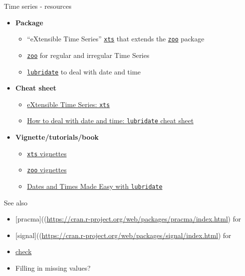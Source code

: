 \documentclass[8pt,ignorenonframetext,]{beamer}
\providecommand{\tightlist}{%
  \setlength{\itemsep}{0pt}\setlength{\parskip}{0pt}}
\begin{document}
\begin{frame}[fragile]{Time series - resources}

\begin{itemize}
\tightlist
\item
  \textbf{Package}

  \begin{itemize}
  \tightlist
  \item
    ``eXtensible Time Series''
    \href{https://cran.r-project.org/web/packages/xts/index.html}{\texttt{xts}}
    that extends the
    \href{https://cran.r-project.org/web/packages/zoo/index.html}{\texttt{zoo}}
    package
  \item
    \href{https://cran.r-project.org/web/packages/zoo/index.html}{\texttt{zoo}}
    for regular and irregular Time Series
  \item
    \href{https://cran.r-project.org/web/packages/lubridate/index.html}{\texttt{lubridate}}
    to deal with date and time
  \end{itemize}
\item
  \textbf{Cheat sheet}

  \begin{itemize}
  \tightlist
  \item
    \href{https://s3.amazonaws.com/assets.datacamp.com/blog_assets/xts_Cheat_Sheet_R.pdf}{eXtensible
    Time Series: \texttt{xts}}
  \item
    \href{https://github.com/rstudio/cheatsheets/raw/master/lubridate.pdf}{How
    to deal with date and time: \texttt{lubridate} cheat sheet}
  \end{itemize}
\item
  \textbf{Vignette/tutorials/book}

  \begin{itemize}
  \tightlist
  \item
    \href{https://cran.r-project.org/web/packages/xts/index.html}{\texttt{xts}
    vignettes}
  \item
    \href{https://cran.r-project.org/web/packages/zoo/index.html}{\texttt{zoo}
    vignettes}
  \item
    \href{http://vita.had.co.nz/papers/lubridate.pdf}{Dates and Times
    Made Easy with \texttt{lubridate}}
  \end{itemize}
\end{itemize}

See also

\begin{itemize}
\tightlist
\item
  {[}pracma{]}((\url{https://cran.r-project.org/web/packages/pracma/index.html})
  for
\item
  {[}signal{]}((\url{https://cran.r-project.org/web/packages/signal/index.html})
  for
\item
  \href{http://uribo.github.io/rpkg_showcase/date_and_time/zoo.html}{check}
\item
  Filling in missing values?
\end{itemize}

\end{frame}
\end{document}
